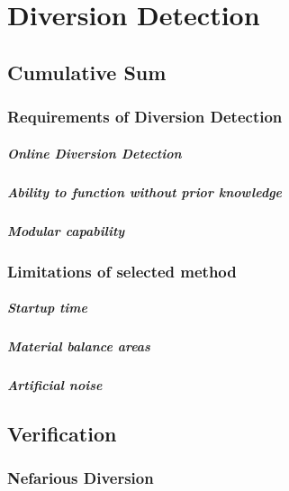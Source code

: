 \chapter[Diversion Detection]{Diversion Detection}
\section{Cumulative Sum}
\subsection{Requirements of Diversion Detection}

\paragraph{Online Diversion Detection}

\paragraph{Ability to function without prior knowledge}

\paragraph{Modular capability}

\subsection{Limitations of selected method}

\paragraph{Startup time}

\paragraph{Material balance areas}

\paragraph{Artificial noise}

\section{Verification}

\subsection{Nefarious Diversion}


